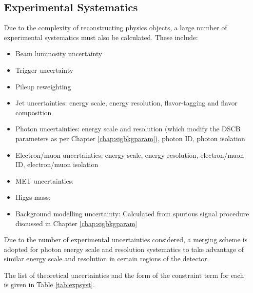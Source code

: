\subsection{Experimental Systematics}

Due to the complexity of reconstructing physics objects, a large number of experimental systematics must also be calculated.
These include:

\begin{itemize}
\item Beam luminosity uncertainty \cite{ATLAS-CONF-2019-021}
\item Trigger uncertainty \cite{trigger} \cite{triggerperformance}
\item Pileup reweighting
\item Jet uncertainties: energy scale, energy resolution,  flavor-tagging and flavor composition \cite{jetuncs1} \cite{jetuncs2} \cite{jetuncs3} \cite{jetuncs4}
\item Photon uncertainties: energy scale and resolution (which modify the DSCB parameters as per Chapter \ref{chap:sigbkgparam}), photon ID, photon isolation \cite{CERN-EP-2019-145} \cite{photuncs}
\item Electron/muon uncertainties: energy scale, energy resolution, electron/muon ID, electron/muon isolation \cite{CERN-EP-2019-145} \cite{photuncs} \cite{elID-CERN-EP-2018-273} \cite{CERN-EP-2016-033}
\item MET uncertainties: \cite{MET1} \cite{MET2}
\item Higgs mass: \cite{Higgsmass}
\item Background modelling uncertainty: Calculated from spurious signal procedure discussed in Chapter \ref{chap:sigbkgparam}
\end{itemize}

Due to the number of experimental uncertainties considered, a merging scheme is adopted for photon energy scale and resolution systematics to take advantage of similar energy scale and resolution in certain regions of the detector.

The list of theoretical uncertainties and the form of the constraint term for each is given in Table \ref{tab:expsyst}.

